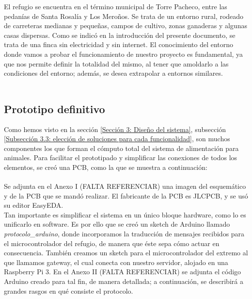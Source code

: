 \documentclass[12pt]{article}
\begin{document}
	\noindent El refugio se encuentra en el término municipal de Torre Pacheco, entre las pedanías de Santa Rosalía y Los Meroños. Se trata de un entorno rural, rodeado de carreteras medianas y pequeñas, campos de cultivo, zonas ganaderas y algunas casas dispersas. Como se indicó en la introducción del presente documento, se trata de una finca sin electricidad y sin internet. El conocimiento del entorno donde vamos a probar el funcionamiento de nuestro proyecto es fundamental, ya que nos permite definir la totalidad del mismo, al tener que amoldarlo a las condiciones del entorno; además, se desea extrapolar a entornos similares. \\
	
	 \\
	
	\subsection[Prototipo definitivo]{Prototipo definitivo}
	
	\noindent Como hemos visto en la sección \ref{Sección 3: Diseño del sistema}, subsección \ref{Subsección 3.3: elección de soluciones para cada funcionalidad}, son muchos componentes los que forman el cómputo total del sistema de alimentación para animales. Para facilitar el prototipado y simplificar las conexiones de todos los elementos, se creó una PCB, como la que se muestra a continuación: \\
	
	 \\
	
	\noindent Se adjunta en el Anexo I (FALTA REFERENCIAR) una imagen del esquemático y de la PCB que se mandó realizar. El fabricante de la PCB es JLCPCB, y se usó su editor EasyEDA. \\
	
	\noindent Tan importante es simplificar el sistema en un único bloque hardware, como lo es unificarlo en software. Es por ello que se creó un sketch de Arduino llamado \textit{protocolo\_arduino}, donde incorporamos la traducción de mensajes recibidos para el microcontrolador del refugio, de manera que éste sepa cómo actuar en consecuencia. También creamos un sketch para el microcontrolador del extremo al que llamamos gateway, el cual conecta con nuestro servidor, alojado en una Raspberry Pi 3.  En el Anexo II (FALTA REFERENCIAR) se adjunta el código Arduino creado para tal fin, de manera detallada; a continuación, se describirá a grandes rasgos en qué consiste el protocolo.\\
	
\end{document}
